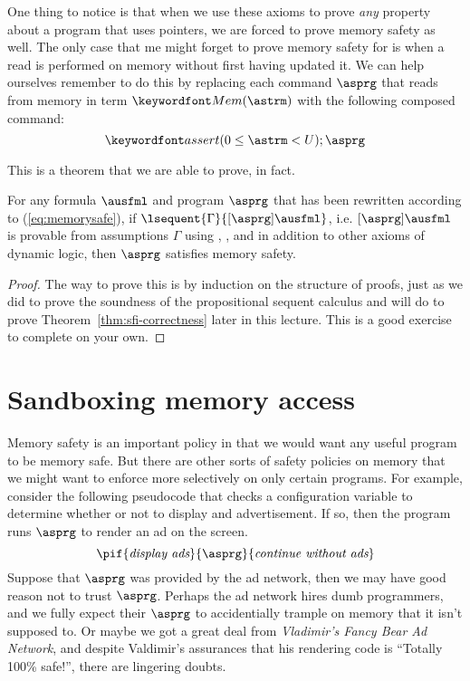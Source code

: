 \documentclass[11pt,twoside]{scrartcl}
\begin{document}
One thing to notice is that when we use these axioms to prove \emph{any} property about a program that uses pointers, we are forced to prove memory safety as well. The only case that me might forget to prove memory safety for is when a read is performed on memory without first having updated it. We can help ourselves remember to do this by replacing each command $\asprg$ that reads from memory in term $\pderef{\astrm}$ with the following composed command:
\begin{equation}
\label{eq:memorysafe}
\passert{0 \le \astrm < \maxmem};\asprg
\end{equation}

This is a theorem that we are able to prove, in fact.
\begin{theorem}
For any formula $\ausfml$ and program $\asprg$ that has been rewritten according to (\ref{eq:memorysafe}), if $\lsequent{\Gamma}{\dibox{\asprg}{\ausfml}}$, i.e. $\dibox{\asprg}{\ausfml}$ is provable from assumptions $\Gamma$ using , , and  in addition to other axioms of dynamic logic, then $\asprg$ satisfies memory safety.
\end{theorem}
\begin{proof}
The way to prove this is by induction on the structure of proofs, just as we did to prove the soundness of the propositional sequent calculus and will do to prove Theorem~\ref{thm:sfi-correctness} later in this lecture. This is a good exercise to complete on your own.
\end{proof}

\section{Sandboxing memory access}
Memory safety is an important policy in that we would want any useful program to be memory safe. But there are other sorts of safety policies on memory that we might want to enforce more selectively on only certain programs. For example, consider the following pseudocode that checks a configuration variable to determine whether or not to display and advertisement. If so, then the program runs $\asprg$ to render an ad on the screen.
\[
\pif{\textit{display ads}}{\asprg}{\textit{continue without ads}}
\]
Suppose that $\asprg$ was provided by the ad network, then we may have good reason not to trust $\asprg$. Perhaps the ad network hires dumb programmers, and we fully expect their $\asprg$ to accidentially trample on memory that it isn't supposed to. Or maybe we got a great deal from \emph{Vladimir's Fancy Bear Ad Network}, and despite Valdimir's assurances that his rendering code is ``Totally 100\% safe!'', there are lingering doubts. 
\end{document}
